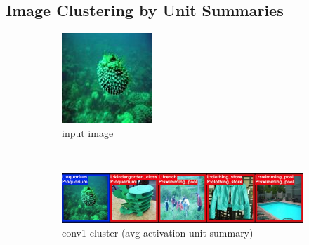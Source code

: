 \subsection{Image Clustering by Unit Summaries}

\begin{figure}[!htb]
\centering
  \begin{subfigure}[b]{.24\linewidth}
    \centering
    \includegraphics[width=.99\textwidth]{figures/clustering/aquarium}
    \caption{input image}\label{fig:clustering_aquarium_input}
  \end{subfigure}  \\%
  \begin{subfigure}[b]{.99\linewidth}
    \centering
    \includegraphics[width=.99\textwidth]{figures/clustering/aquarium_conv1_avg}
    \caption{conv1 cluster (avg activation unit summary)}\label{fig:clustering_aquarium_conv1}
  \end{subfigure}  \\%
  \begin{subfigure}[b]{.99\linewidth}

\end{subfigure}
\end{figure}
